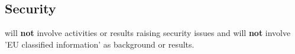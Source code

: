 \subsection{Security}
\proj will \textbf{not} involve activities or results raising security issues and will \textbf{not} involve 'EU classified information' as background or results.